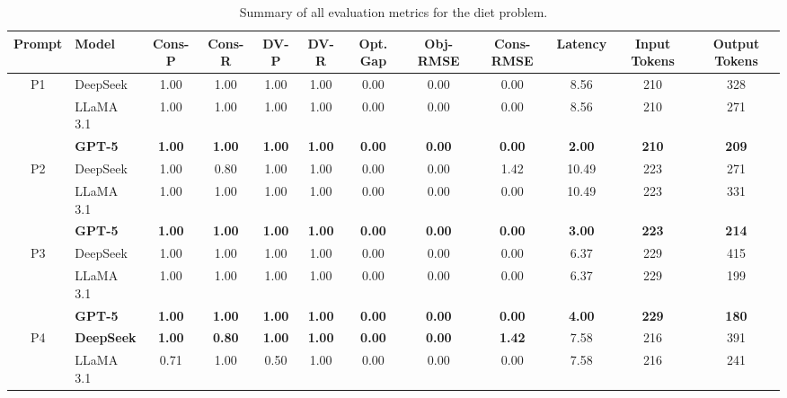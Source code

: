 \documentclass[review,12pt]{elsarticle}
\begin{document}
\begin{table}[htbp]
\centering
\caption{Summary of all evaluation metrics for the diet problem.}
\label{table:diet_summary}
\renewcommand{\arraystretch}{0.9} %
\setlength{\tabcolsep}{2pt}      %
\scriptsize                       %

\begin{adjustbox}{max width=\textwidth}
\begin{tabular}{c l c c c c c c c c c c}
\toprule
\textbf{Prompt} & \textbf{Model} & \textbf{Cons-P} & \textbf{Cons-R} & \textbf{DV-P} & \textbf{DV-R} & \textbf{Opt. Gap} & \textbf{Obj-RMSE} & \textbf{Cons-RMSE} & \textbf{Latency} & \textbf{Input Tokens} & \textbf{Output Tokens} \\
\midrule
P1 & DeepSeek & 1.00 & 1.00 & 1.00 & 1.00 & 0.00 & 0.00 & 0.00 & 8.56 & 210 & 328 \\[-4pt]
   & LLaMA 3.1 & 1.00 & 1.00 & 1.00 & 1.00 & 0.00 & 0.00 & 0.00 & 8.56 & 210 & 271 \\[-4pt]
   & \textbf{GPT-5} & \textbf{1.00} & \textbf{1.00} & \textbf{1.00} & \textbf{1.00} & \textbf{0.00} & \textbf{0.00} & \textbf{0.00} & \textbf{2.00} & \textbf{210} & \textbf{209} \\
\midrule
P2 & DeepSeek & 1.00 & 0.80 & 1.00 & 1.00 & 0.00 & 0.00 & 1.42 & 10.49 & 223 & 271 \\[-4pt]
   & LLaMA 3.1 & 1.00 & 1.00 & 1.00 & 1.00 & 0.00 & 0.00 & 0.00 & 10.49 & 223 & 331 \\[-4pt]
   & \textbf{GPT-5} & \textbf{1.00} & \textbf{1.00} & \textbf{1.00} & \textbf{1.00} & \textbf{0.00} & \textbf{0.00} & \textbf{0.00} & \textbf{3.00} & \textbf{223} & \textbf{214} \\
\midrule
P3 & DeepSeek & 1.00 & 1.00 & 1.00 & 1.00 & 0.00 & 0.00 & 0.00 & 6.37 & 229 & 415 \\[-4pt]
   & LLaMA 3.1 & 1.00 & 1.00 & 1.00 & 1.00 & 0.00 & 0.00 & 0.00 & 6.37 & 229 & 199 \\[-4pt]
   & \textbf{GPT-5} & \textbf{1.00} & \textbf{1.00} & \textbf{1.00} & \textbf{1.00} & \textbf{0.00} & \textbf{0.00} & \textbf{0.00} & \textbf{4.00} & \textbf{229} & \textbf{180} \\
\midrule
P4 & \textbf{DeepSeek} & \textbf{1.00} & \textbf{0.80} & \textbf{1.00} & \textbf{1.00} & \textbf{0.00} & \textbf{0.00} & \textbf{1.42} & 7.58 & 216 & 391 \\[-4pt]
   & LLaMA 3.1 & 0.71 & 1.00 & 0.50 & 1.00 & 0.00 & 0.00 & 0.00 & 7.58 & 216 & 241 \\[-4pt]

\end{tabular}
\end{adjustbox}
\end{table}
\end{document}
